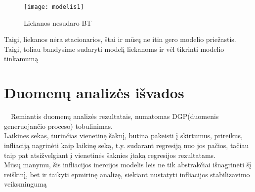 \documentclass[a4paper]{article}
\begin{document}
\begin{figure}[H]
\centering 
\texttt{[image: modelis1]}
\caption{Liekanos nesudaro BT}
\end{figure}


\textnormal{Taigi, liekanos nėra stacionarios, štai ir mūsų ne itin gero modelio priežastis. Taigi, toliau bandysime sudaryti modelį liekanoms ir vėl tikrinti modelio tinkamumą }


\newpage
\section{Duomenų analizės išvados}
\textnormal{\             \ Remiantis duomenų analizės rezultatais, numatomas DGP(duomenis generuojančio proceso) tobulinimas.\\ Laikines sekas, turinčias vienetinę šaknį, būtina pakeisti į skirtumus, prireikus, infliaciją nagrinėti kaip laikinę seką,  t.y. sudarant regresiją nuo jos pačios, tačiau taip pat atsižvelgiant į vienetinės šaknies  įtaką regresijos rezultatams.\\ Mūsų manymu, šis infliacijos inercijos modelis leis ne tik abstrakčiai išnagrinėti šį reiškinį, bet ir taikyti epmirinę analizę, siekiant nustatyti infliacijos stabilizavimo veiksmingumą}
\end{document}
